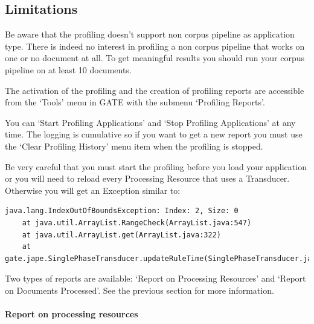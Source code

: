 \subsection{Limitations}

Be aware that the profiling doesn't support non corpus pipeline as
application type. There is indeed no interest in profiling a non corpus
pipeline that works on one or no document at all. To get meaningful results
you should run your corpus pipeline on at least 10 documents.


The activation of the profiling and the creation of profiling reports are
accessible from the `Tools' menu in GATE with the submenu `Profiling
Reports'.

You can `Start Profiling Applications' and `Stop Profiling Applications' at
any time. The logging is cumulative so if you want to get a new report you
must use the `Clear Profiling History' menu item when the profiling is stopped.

Be very careful that you must start the profiling before you load your
application or you will need to reload every Processing Resource that uses a
Transducer. Otherwise you will get an Exception similar to:

\begin{small}
\begin{verbatim}
java.lang.IndexOutOfBoundsException: Index: 2, Size: 0
	at java.util.ArrayList.RangeCheck(ArrayList.java:547)
	at java.util.ArrayList.get(ArrayList.java:322)
	at gate.jape.SinglePhaseTransducer.updateRuleTime(SinglePhaseTransducer.java:678)
\end{verbatim}
\end{small}

Two types of reports are available: `Report on Processing Resources' and
`Report on Documents Processed'. See the previous section for more
information.


\paragraph{Report on processing resources}

